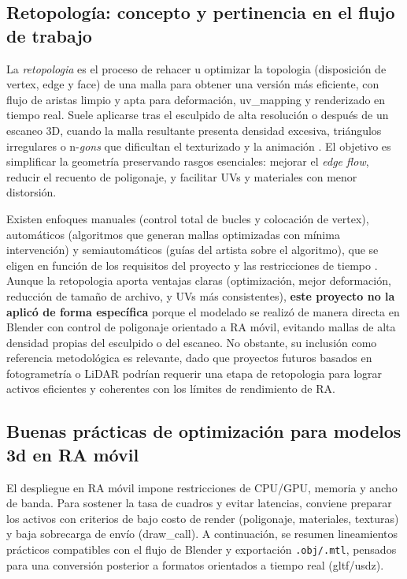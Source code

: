 \subsection*{Retopología: concepto y pertinencia en el flujo de trabajo}

La \textit{\gls{retopologia}} es el proceso de rehacer u optimizar la \gls{topologia} (disposición de \gls{vertex}, \gls{edge} y \gls{face}) de una \gls{malla} para obtener una versión más eficiente, con flujo de aristas limpio y apta para deformación, \gls{uv_mapping} y renderizado en tiempo real. Suele aplicarse tras el esculpido de alta resolución o después de un escaneo 3D, cuando la \gls{malla} resultante presenta densidad excesiva, triángulos irregulares o n-\emph{gons} que dificultan el \gls{texturizado} y la animación \cite{AutodeskRetopo}. El objetivo es simplificar la geometría preservando rasgos esenciales: mejorar el \textit{edge flow}, reducir el recuento de \gls{poligonaje}, y facilitar UVs y materiales con menor distorsión.

Existen enfoques manuales (control total de bucles y colocación de \gls{vertex}), automáticos (algoritmos que generan \gls{malla}s optimizadas con mínima intervención) y semiautomáticos (guías del artista sobre el algoritmo), que se eligen en función de los requisitos del proyecto y las restricciones de tiempo \cite{AutodeskRetopo}. Aunque la \gls{retopologia} aporta ventajas claras (optimización, mejor deformación, reducción de tamaño de archivo, y UVs más consistentes), \textbf{este proyecto no la aplicó de forma específica} porque el modelado se realizó de manera directa en Blender con control de \gls{poligonaje} orientado a RA móvil, evitando \gls{malla}s de alta densidad propias del esculpido o del escaneo. No obstante, su inclusión como referencia metodológica es relevante, dado que proyectos futuros basados en fotogrametría o LiDAR podrían requerir una etapa de \gls{retopologia} para lograr activos eficientes y coherentes con los límites de rendimiento de RA.


\subsection*{Buenas prácticas de optimización para modelos \gls{3d} en RA móvil}

El despliegue en RA móvil impone restricciones de CPU/GPU, memoria y ancho de banda. Para sostener la tasa de cuadros y evitar latencias, conviene preparar los activos con criterios de bajo costo de render (\gls{poligonaje}, materiales, texturas) y baja sobrecarga de envío (\gls{draw_call}). A continuación, se resumen lineamientos prácticos compatibles con el flujo de Blender y exportación \texttt{.obj/.mtl}, pensados para una conversión posterior a formatos orientados a tiempo real (\gls{gltf}/\gls{usdz}).

